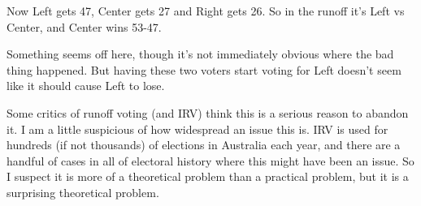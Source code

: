 \documentclass[11pt,]{article}
\begin{document}
Now Left gets 47, Center gets 27 and Right gets 26. So in the runoff
it's Left vs Center, and Center wins 53-47.

Something seems off here, though it's not immediately obvious where the
bad thing happened. But having these two voters start voting for Left
doesn't seem like it should cause Left to lose.

Some critics of runoff voting (and IRV) think this is a serious reason
to abandon it. I am a little suspicious of how widespread an issue this
is. IRV is used for hundreds (if not thousands) of elections in
Australia each year, and there are a handful of cases in all of
electoral history where this might have been an issue. So I suspect it
is more of a theoretical problem than a practical problem, but it is a
surprising theoretical problem.
\end{document}
